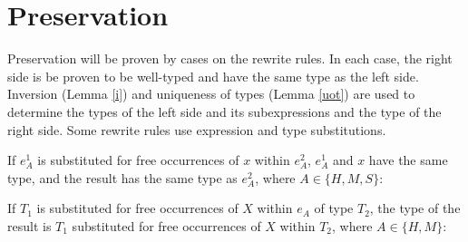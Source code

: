 \section{Preservation}

Preservation will be proven by cases on the rewrite rules.  In each case, the right side is be proven to be well-typed and have the same type as the left side.  Inversion (Lemma \ref{i}) and uniqueness of types (Lemma \ref{uot}) are used to determine the types of the left side and its subexpressions and the type of the right side.  Some rewrite rules use expression and type substitutions.

If $e_{A}^{1}$ is substituted for free occurrences of $x$ within $e_{A}^{2}$, $e_{A}^{1}$ and $x$ have the same type, and the result has the same type as $e_{A}^{2}$, where $A\in\lbrace H,M,S\rbrace$:



If $T_{1}$ is substituted for free occurrences of $X$ within $e_{A}$ of type $T_{2}$, the type of the result is $T_{1}$ substituted for free occurrences of $X$ within $T_{2}$, where $A\in\lbrace H,M\rbrace$:





